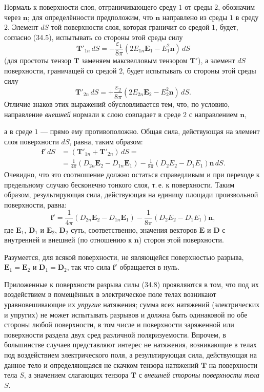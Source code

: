 \documentclass[a4paper,10pt]{article}
\begin{document}
Нормаль к поверхности слоя, отграничивающего среду $1$ от среды $2$,
обозначим через $\mathbf{n}$; для определённости предположим, что
$\mathbf{n}$ направлено из среды $1$ в среду $2$. Элемент $dS$ той
поверхности слоя, которая граничит со средой $1$, будет, согласно
(34.5), испытывать со стороны этой среды силу
$$
    \mathbf{T}'_{1n}\,dS = -\frac{\varepsilon_1}{8\pi}
    (2E_{1n}\mathbf{E}_1 - E_1^2\mathbf{n})\,dS
$$
(для простоты тензор $\mathbf{T}$ заменяем максвелловым тензором
$\mathbf{T}'$), а элемент $dS$ поверхности, граничащей со средой $2$,
будет испытывать со стороны этой среды силу
$$
    \mathbf{T}'_{2n}\,dS = +\frac{\varepsilon_2}{8\pi}
    (2E_{2n}\mathbf{E}_2 - E_2^2\mathbf{n})\,dS.
$$
Отличие знаков этих выражений обусловливается тем, что, по условию,
направление \textit{внешней} нормали к слою совпадает в среде $2$
с направлением $\mathbf{n}$,


а в среде $1$ — прямо ему противоположно. Общая сила, действующая
на элемент слоя поверхности $dS$, равна, таким образом:
\begin{align*}
    \mathbf{f}'\,dS &= (\mathbf{T}'_{1n} + \mathbf{T}'_{2n})\,dS = \\
    &= \frac{1}{4\pi}(D_{2n}\mathbf{E}_2 - D_{1n}\mathbf{E}_1)
     - \frac{1}{8\pi}(D_2 E_2 - D_1 E_1)\mathbf{n}\,dS.
\end{align*}
Очевидно, что это соотношение должно остаться справедливым и при
переходе к предельному случаю бесконечно тонкого слоя, т.\,е.
к поверхности. Таким образом, результирующая сила, действующая на
единицу площади произвольной поверхности, равна:
\begin{equation}
    \mathbf{f}' = \frac{1}{4\pi}(D_{2n}\mathbf{E}_2 - D_{1n}\mathbf{E}_1)
               - \frac{1}{8\pi}(D_2 E_2 - D_1 E_1)\mathbf{n},
    \tag{34.8}
\end{equation}
где $\mathbf{E}_1$, $\mathbf{D}_1$ и $\mathbf{E}_2$, $\mathbf{D}_2$ суть,
соответственно, значения векторов $\mathbf{E}$ и $\mathbf{D}$ с внутренней
и внешней (по отношению к $\mathbf{n}$) сторон этой поверхности.

Разумеется, для всякой поверхности, не являющейся поверхностью разрыва,
$\mathbf{E}_1 = \mathbf{E}_2$ и $\mathbf{D}_1 = \mathbf{D}_2$, так что
сила $\mathbf{f}'$ обращается в нуль.

Приложенные к поверхности разрыва силы (34.8) проявляются в том, что
под их воздействием в помещённых в электрическое поле телах возникают
уравновешивающие их \textit{упругие} натяжения; сумма всех натяжений
(электрических и упругих) не может испытывать разрывов и должна быть
одинаковой по обе стороны любой поверхности, в том числе и поверхности
заряженной или поверхности раздела двух сред различной поляризуемости.
Впрочем, в большинстве случаев представляют интерес не натяжения,
возникающие в телах под воздействием электрического поля, а
результирующая сила, действующая на данное тело и определяющаяся не
скачком тензора натяжений $\mathbf{T}$ на поверхности тела $S$, а
значением слагающих тензора $\mathbf{T}$ с \textit{внешней стороны
поверхности тела} $S$.
\end{document}
